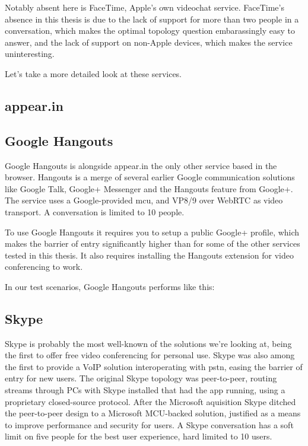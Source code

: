 Notably absent here is FaceTime, Apple's own videochat service. FaceTime's absence in this thesis is due to the lack of support for more than two people in a conversation, which makes the optimal topology question embarassingly easy to answer, and the lack of support on non-Apple devices, which makes the service uninteresting.

Let's take a more detailed look at these services.

\subsection{appear.in}



\subsection{Google Hangouts}

Google Hangouts is alongside appear.in the only other service based in the browser. Hangouts is a merge of several earlier Google communication solutions like Google Talk, Google+ Messenger and the Hangouts feature from Google+. The service uses a Google-provided \gls{mcu}, and VP8/9 over WebRTC as video transport. A conversation is limited to 10 people.

To use Google Hangouts it requires you to setup a public Google+ profile, which makes the barrier of entry significantly higher than for some of the other services tested in this thesis. It also requires installing the Hangouts extension for video conferencing to work.

In our test scenarios, Google Hangouts performs like this:



\subsection{Skype}

Skype is probably the most well-known of the solutions we're looking at, being the first to offer free video conferencing for personal use. Skype was also among the first to provide a VoIP solution interoperating with \gls{pstn}, easing the barrier of entry for new users. The original Skype topology was peer-to-peer, routing streams through PCs with Skype installed that had the app running, using a proprietary closed-source protocol. After the Microsoft aquisition Skype ditched the peer-to-peer design to a Microsoft MCU-backed solution, justified as a means to improve performance and security for users. A Skype conversation has a soft limit on five people for the best user experience, hard limited to 10 users.

